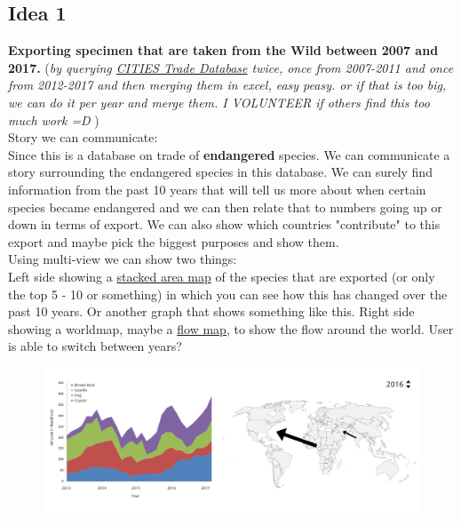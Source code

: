 


\iffalse %

\subsection{Idea 1 }
\textbf{Exporting specimen that are taken from the Wild between 2007 and 2017.}
(\textit{by querying \href{https://trade.cites.org/en/cites_trade/}{CITIES Trade Database} twice, once from 2007-2011 and once from 2012-2017 and then merging them in excel, easy peasy. or if that is too big, we can do it per year and merge them. I VOLUNTEER if others find this too much work =D }) \\

Story we can communicate: \\
Since this is a database on trade of \textbf{endangered} species. We can communicate a story surrounding the endangered species in this database. We can surely find information from the past 10 years that will tell us more about when certain species became endangered and we can then relate that to numbers going up or down in terms of export. We can also show which countries "contribute" to this export and maybe pick the biggest purposes and show them.\\

Using multi-view we can show two things: \\
Left side showing a \href{https://datavizcatalogue.com/methods/stacked_area_graph.html}{stacked area map} of the species that are exported (or only the top 5 - 10 or something) in which you can see how this has changed over the past 10 years. Or another graph that shows something like this. Right side showing a worldmap, maybe a \href{https://datavizcatalogue.com/methods/flow_map.html}{flow map}, to show the flow around the world. User is able to switch between years?

\begin{figure} [h] \label{visid1}
\includegraphics[width=12cm]{images/idea1-maaike.png}
\caption{}
\end{figure}

